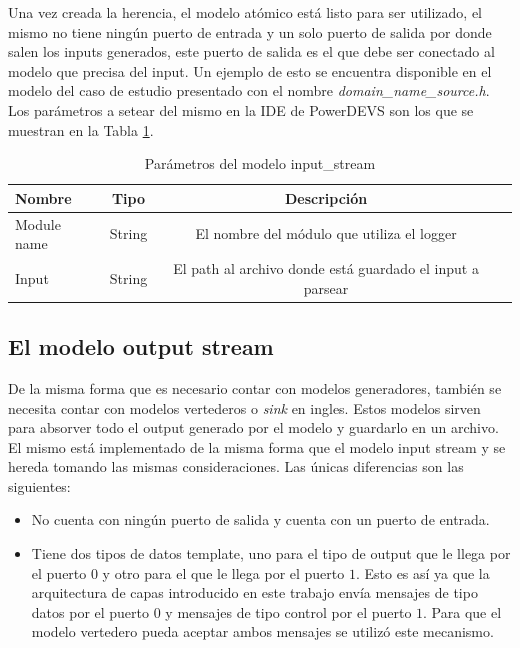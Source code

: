 \documentclass[10pt,a4paper]{article}
\begin{document}
Una vez creada la herencia, el modelo atómico está listo para ser utilizado, el mismo no tiene ningún puerto de entrada y un solo puerto de salida por donde salen los inputs generados, este puerto de salida es el que debe ser conectado al modelo que precisa del input. Un ejemplo de esto se encuentra disponible en el modelo del caso de estudio presentado con el nombre \textit{domain\_name\_source.h}. \\

Los parámetros a setear del mismo en la IDE de PowerDEVS son los que se muestran en la Tabla \ref{table: input stream parameters}.
\begin{table}[h]
\begin{tabular}{|l|c|c|c|}
  \hline
  \textbf{Nombre} & \textbf{Tipo} & \textbf{Descripción} \\
  \hline
  Module name & String & El nombre del módulo que utiliza el logger \\
  \hline
  Input & String & El path al archivo donde está guardado el input a parsear \\
  \hline
\end{tabular}
\caption{Parámetros del modelo input\_stream}
\label{table: input stream parameters}
\end{table}

\subsection{El modelo output stream}
De la misma forma que es necesario contar con modelos generadores, también se necesita contar con modelos vertederos o \textit{sink} en ingles. Estos modelos sirven para absorver todo el output generado por el modelo y guardarlo en un archivo. El mismo está implementado de la misma forma que el modelo input stream y se hereda tomando las mismas consideraciones. Las únicas diferencias son las siguientes: \\

\begin{itemize}
\item No cuenta con ningún puerto de salida y cuenta con un puerto de entrada.
\item Tiene dos tipos de datos template, uno para el tipo de output que le llega por el puerto $0$ y otro para el que le llega por el puerto $1$. Esto es así ya que la arquitectura de capas introducido en este trabajo envía mensajes de tipo datos por el puerto $0$ y mensajes de tipo control por el puerto $1$. Para que el modelo vertedero pueda aceptar ambos mensajes se utilizó este mecanismo.
\end{itemize}
\end{document}
